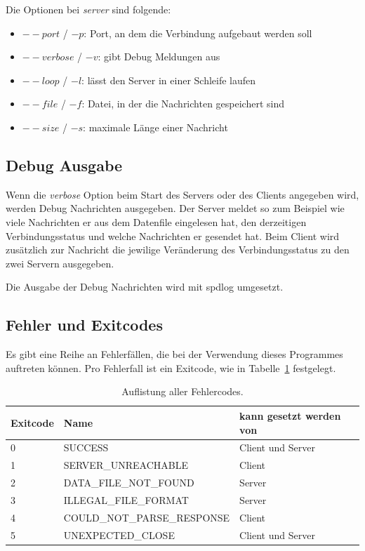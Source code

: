 \documentclass[]{article}
\begin{document}
\noindent
Die Optionen bei \textit{server} sind folgende:

\begin{itemize}
	\item $--port$ / $-p$: Port, an dem die Verbindung aufgebaut werden soll
	\item $--verbose$ / $-v$: gibt Debug Meldungen aus
	\item $--loop$ / $-l$: lässt den Server in einer Schleife laufen
	\item $--file$ / $-f$: Datei, in der die Nachrichten gespeichert sind
	\item $--size$ / $-s$: maximale Länge einer Nachricht
\end{itemize}

\subsection{Debug Ausgabe}
Wenn die \textit{verbose} Option beim Start des Servers oder des Clients angegeben wird, werden Debug Nachrichten ausgegeben. Der Server meldet so zum Beispiel wie viele Nachrichten er aus dem Datenfile eingelesen hat, den derzeitigen Verbindungsstatus und welche Nachrichten er gesendet hat. Beim Client wird zusätzlich zur Nachricht die jewilige Veränderung des Verbindungsstatus zu den zwei Servern ausgegeben.

Die Ausgabe der Debug Nachrichten wird mit spdlog umgesetzt.

\subsection{Fehler und Exitcodes}
Es gibt eine Reihe an Fehlerfällen, die bei der Verwendung dieses Programmes auftreten können. Pro Fehlerfall ist ein Exitcode, wie in Tabelle~\ref{tab:exit_codes} festgelegt.

\begin{table}[]
	\centering
	\begin{tabular}{|l|l|l|}
		\hline
		\textbf{Exitcode} & \textbf{Name} & \textbf{kann gesetzt werden von} \\ \hline
		0          & SUCCESS                & Client und Server     \\ \hline
		1          & SERVER\_UNREACHABLE    & Client                \\ \hline
		2          & DATA\_FILE\_NOT\_FOUND & Server                \\ \hline
		3          & ILLEGAL\_FILE\_FORMAT     & Server                \\ \hline
		4          & COULD\_NOT\_PARSE\_RESPONSE      & Client                \\ \hline
		5          & UNEXPECTED\_CLOSE      & Client und Server     \\ \hline
	\end{tabular}
	\caption{Auflistung aller Fehlercodes.}
	\label{tab:exit_codes}
\end{table}
\end{document}
